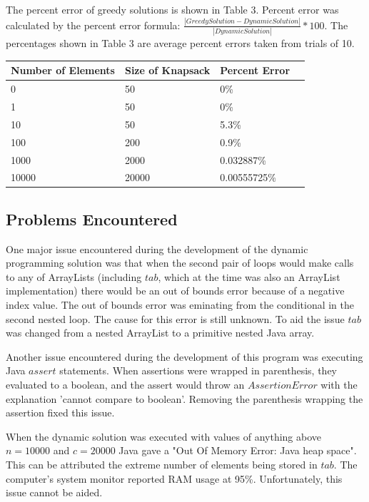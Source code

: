 \documentclass[onecolumn, 12pt, article]{IEEEtran}
\numberwithin{case}{problem}
\numberwithin{condition}{problem}
\numberwithin{condition}{subsection}
\numberwithin{definition}{section}
\theoremstyle{remark}
\numberwithin{question}{problem}
\theoremstyle{plain}
\numberwithin{answer}{problem}
\numberwithin{solution}{section}
\numberwithin{equation}{section}%
\begin{document}
The percent error of greedy solutions is shown in Table 3. Percent error was calculated by the percent error formula: $\frac{ | Greedy Solution - Dynamic Solution | }{ | Dynamic Solution | } * 100$. The percentages shown in Table 3 are average percent errors taken from trials of 10.
\begin{center}
\begin{tabular}{|l|l|l|l}
\hline Number of Elements & Size of Knapsack & Percent Error \\
\hline 0 & 50 & 0\% \\
\hline 1 & 50 & 0\% \\
\hline 10 & 50 & 5.3\% \\
\hline 100 & 200 & 0.9\% \\
\hline 1000 & 2000 & 0.032887\% \\
\hline 10000 & 20000 & 0.00555725\% \\
\hline
\end{tabular}
\end{center}

\subsection{Problems Encountered}
One major issue encountered during the development of the dynamic programming solution was that when the second pair of loops would make calls to any of ArrayLists (including $tab$, which at the time was also an ArrayList implementation) there would be an out of bounds error because of a negative index value. The out of bounds error was eminating from the conditional in the second nested loop. The cause for this error is still unknown. To aid the issue $tab$ was changed from a nested ArrayList to a primitive nested Java array. 

Another issue encountered during the development of this program was executing Java $assert$ statements. When assertions were wrapped in parenthesis, they evaluated to a boolean, and the assert would throw an $AssertionError$ with the explanation 'cannot compare to boolean'. Removing the parenthesis wrapping the assertion fixed this issue.

When the dynamic solution was executed with values of anything above $n = 10000$ and $c = 20000$ Java gave a "Out Of Memory Error: Java heap space". This can be attributed the extreme number of elements being stored in $tab$. The computer's system monitor reported RAM usage at 95\%. Unfortunately, this issue cannot be aided. 
\end{document}
